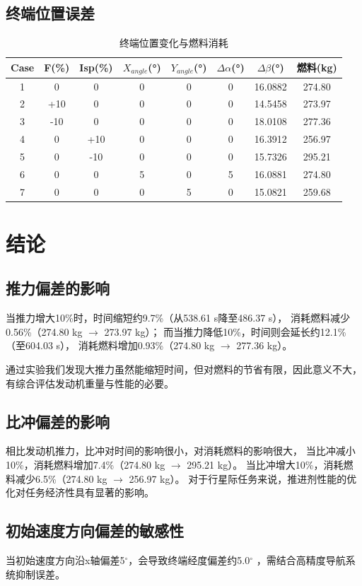 \documentclass[12pt,a4paper]{article}
\begin{document}
\subsection{终端位置误差}
\begin{table}[H]
\centering
\caption{终端位置变化与燃料消耗}
\begin{tabular}{cccccccc}
\toprule
Case & F(\%) & Isp(\%) & $X_{angle}$(°) & $Y_{angle}$(°) & $\Delta\alpha$(°) & $\Delta\beta$(°) & 燃料(kg) \\
\midrule
1 & 0   & 0   & 0 & 0 & 0 & 16.0882 & 274.80 \\
2 & +10 & 0   & 0 & 0 & 0 & 14.5458 & 273.97 \\
3 & -10 & 0   & 0 & 0 & 0 & 18.0108 & 277.36 \\
4 & 0   & +10 & 0 & 0 & 0 & 16.3912 & 256.97 \\
5 & 0   & -10 & 0 & 0 & 0 & 15.7326 & 295.21 \\
6 & 0   & 0   & 5 & 0 & 5 & 16.0881 & 274.80 \\
7 & 0   & 0   & 0 & 5 & 0 & 15.0821 & 259.68 \\
\bottomrule
\end{tabular}
\end{table}

\section{结论}
\subsection{推力偏差的影响}
当推力增大10\%时，时间缩短约9.7\%（从538.61 s降至486.37 s），
消耗燃料减少0.56\%（274.80 kg $\to$ 273.97 kg）；
而当推力降低10\%，时间则会延长约12.1\%（至604.03 s），
消耗燃料增加0.93\%（274.80 kg $\to$ 277.36 kg）。

通过实验我们发现大推力虽然能缩短时间，但对燃料的节省有限，因此意义不大，有综合评估发动机重量与性能的必要。

\subsection{比冲偏差的影响}
相比发动机推力，比冲对时间的影响很小，对消耗燃料的影响很大，
当比冲减小10\%，消耗燃料增加7.4\%（274.80 kg $\to$ 295.21 kg）。
当比冲增大10\%，消耗燃料减少6.5\%（274.80 kg $\to$ 256.97 kg）。
对于行星际任务来说，推进剂性能的优化对任务经济性具有显著的影响。

\subsection{初始速度方向偏差的敏感性}
当初始速度方向沿x轴偏差5$^\circ$，会导致终端经度偏差约5.0$^\circ$
，需结合高精度导航系统抑制误差。
\end{document}
